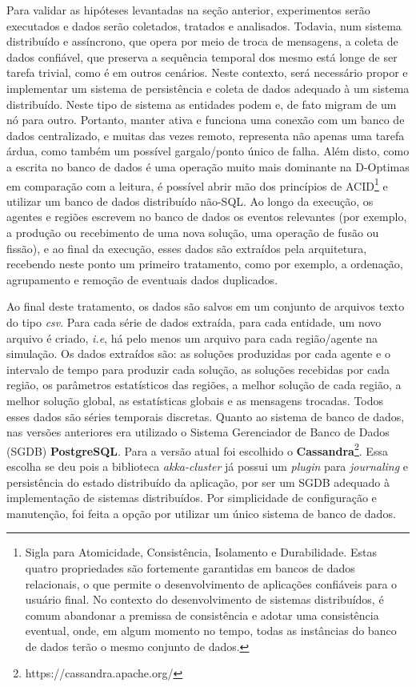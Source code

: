 Para validar as hipóteses levantadas na seção anterior, experimentos serão executados e dados serão coletados, tratados e analisados. Todavia, num sistema distribuído e assíncrono, que opera por meio de troca de mensagens, a coleta de dados confiável, que preserva a sequência temporal dos mesmo está longe de ser tarefa trivial, como é em outros cenários. Neste contexto, será necessário propor e implementar um sistema de persistência e coleta de dados adequado à um sistema distribuído. Neste tipo de sistema as entidades podem e, de fato migram de um nó para outro. Portanto, manter ativa e funciona uma conexão com um banco de dados centralizado, e muitas das vezes remoto, representa não apenas uma tarefa árdua, como também um possível gargalo/ponto único de falha. Além disto, como a escrita no banco de dados é uma operação muito mais dominante na D-Optimas em comparação com a leitura, é possível abrir mão dos princípios de ACID\footnote{Sigla  para Atomicidade, Consistência, Isolamento e Durabilidade. Estas quatro propriedades são fortemente garantidas em bancos de dados relacionais, o que permite o desenvolvimento de aplicações confiáveis para o usuário final. No contexto do desenvolvimento de sistemas distribuídos, é comum abandonar a premissa de consistência e adotar uma consistência eventual, onde, em algum momento no tempo, todas as instâncias do banco de dados terão o mesmo conjunto de dados.} e utilizar um banco de dados distribuído não-SQL. Ao longo da execução, os agentes e regiões escrevem no banco de dados os eventos relevantes (por exemplo, a produção ou recebimento de uma nova solução, uma operação de fusão ou fissão), e ao final da execução, esses dados são extraídos pela arquitetura, recebendo neste ponto um primeiro tratamento, como por exemplo, a ordenação, agrupamento e remoção de eventuais dados duplicados. 

Ao final deste tratamento, os dados são salvos em um conjunto de arquivos texto do tipo \textit{csv}. Para cada série de dados extraída, para cada entidade, um novo arquivo é criado, \textit{i.e}, há pelo menos um arquivo para cada região/agente na simulação. Os dados extraídos são: as soluções produzidas por cada agente e o intervalo de tempo para produzir cada solução, as soluções recebidas por cada região, os parâmetros estatísticos das regiões, a melhor solução de cada região, a melhor solução global, as estatísticas globais e as mensagens trocadas. Todos esses dados são séries temporais discretas. Quanto ao sistema de banco de dados, nas versões anteriores era utilizado o Sistema Gerenciador de Banco de Dados (SGDB) \textbf{PostgreSQL}. Para a versão atual foi escolhido o \textbf{Cassandra}\footnote{https://cassandra.apache.org/}. Essa escolha se deu pois a biblioteca \textit{akka-cluster} já possui um \textit{plugin} para \textit{journaling} e persistência do estado distribuído da aplicação, por ser um SGDB adequado à implementação de sistemas distribuídos. Por simplicidade de configuração e manutenção, foi feita a opção por utilizar um único sistema de banco de dados.

